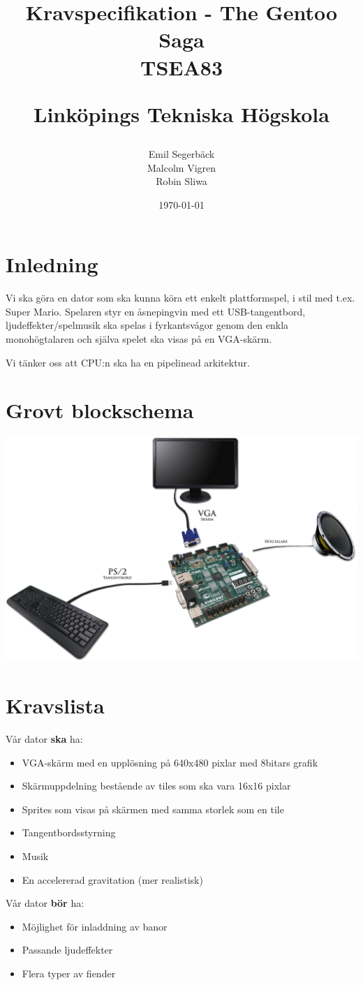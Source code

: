 \documentclass[a4paper,titlepage]{article}
\title{
\textbf{Kravspecifikation - The Gentoo Saga} \\
\large{TSEA83}
\author{
    Emil Segerbäck\\Malcolm Vigren\\Robin Sliwa
  }
\small{Linköpings Tekniska Högskola}
\renewcommand{\dateseparator}{-}
\date{\today}
}
\begin{document}
	\maketitle
	\newpage

\section{Inledning}
Vi ska göra en dator som ska kunna köra ett enkelt plattformspel, 
i stil med t.ex. Super Mario. Spelaren styr en åsnepingvin med ett USB-tangentbord,
ljudeffekter/spelmusik ska spelas i fyrkantsvågor genom den enkla 
monohögtalaren och själva spelet ska visas på en VGA-skärm.

Vi tänker oss att CPU:n ska ha en pipelinead arkitektur.

\section{Grovt blockschema}
\includegraphics[width=14cm]{blockschema.png}

\section{Kravslista}
Vår dator \textbf{ska} ha:
\begin{itemize}
    \item VGA-skärm med en upplösning på 640x480 pixlar med 8bitars grafik
    \item Skärmuppdelning bestående av tiles som ska vara 16x16 pixlar
    \item Sprites som visas på skärmen med samma storlek som en tile
	\item Tangentbordsstyrning
    \item Musik
    \item En accelererad gravitation (mer realistisk)
\end{itemize}
Vår dator \textbf{bör} ha:
\begin{itemize}
	\item Möjlighet för inladdning av banor
	\item Passande ljudeffekter 
	\item Flera typer av fiender
\end{itemize}
\end{document}
